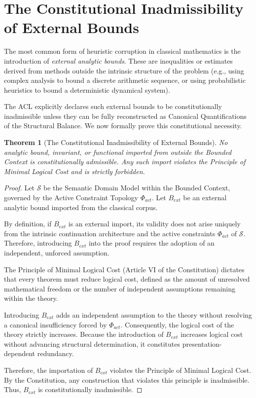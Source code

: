 \documentclass[12pt,openany]{extbook}
\theoremstyle{plain}
\newtheorem{theorem}{Theorem}[chapter]
\theoremstyle{definition}
\begin{document}
\section{The Constitutional Inadmissibility of External Bounds}

The most common form of heuristic corruption in classical mathematics is the introduction of \emph{external analytic bounds}. These are inequalities or estimates derived from methods outside the intrinsic structure of the problem (e.g., using complex analysis to bound a discrete arithmetic sequence, or using probabilistic heuristics to bound a deterministic dynamical system).

The ACL explicitly declares such external bounds to be constitutionally inadmissible unless they can be fully reconstructed as Canonical Quantifications of the Structural Balance. We now formally prove this constitutional necessity.

\begin{theorem}[The Constitutional Inadmissibility of External Bounds]
No analytic bound, invariant, or functional imported from outside the Bounded Context is constitutionally admissible. Any such import violates the Principle of Minimal Logical Cost and is strictly forbidden.
\end{theorem}

\begin{proof}
Let $\mathcal{S}$ be the Semantic Domain Model within the Bounded Context, governed by the Active Constraint Topology $\Phi_{act}$. Let $B_{ext}$ be an external analytic bound imported from the classical corpus.

By definition, if $B_{ext}$ is an external import, its validity does not arise uniquely from the intrinsic continuation architecture and the active constraints $\Phi_{act}$ of $\mathcal{S}$. Therefore, introducing $B_{ext}$ into the proof requires the adoption of an independent, unforced assumption.

The Principle of Minimal Logical Cost (Article VI of the Constitution) dictates that every theorem must reduce logical cost, defined as the amount of unresolved mathematical freedom or the number of independent assumptions remaining within the theory. 

Introducing $B_{ext}$ adds an independent assumption to the theory without resolving a canonical insufficiency forced by $\Phi_{act}$. Consequently, the logical cost of the theory strictly increases. Because the introduction of $B_{ext}$ increases logical cost without advancing structural determination, it constitutes presentation-dependent redundancy.

Therefore, the importation of $B_{ext}$ violates the Principle of Minimal Logical Cost. By the Constitution, any construction that violates this principle is inadmissible. Thus, $B_{ext}$ is constitutionally inadmissible.
\end{proof}
\end{document}
